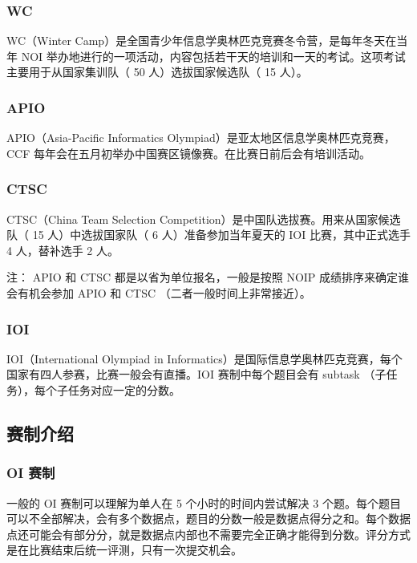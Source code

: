 \subsubsection{WC}

WC（Winter Camp）是全国青少年信息学奥林匹克竞赛冬令营，是每年冬天在当年 NOI 举办地进行的一项活动，内容包括若干天的培训和一天的考试。这项考试主要用于从国家集训队（ 50 人）选拔国家候选队（ 15 人）。

\subsubsection{APIO}

APIO（Asia-Pacific Informatics Olympiad）是亚太地区信息学奥林匹克竞赛，CCF 每年会在五月初举办中国赛区镜像赛。在比赛日前后会有培训活动。

\subsubsection{CTSC}

CTSC（China Team Selection Competition）是中国队选拔赛。用来从国家候选队（ 15 人）中选拔国家队（ 6 人）准备参加当年夏天的 IOI 比赛，其中正式选手 4 人，替补选手 2 人。

注： APIO 和 CTSC 都是以省为单位报名，一般是按照 NOIP 成绩排序来确定谁会有机会参加 APIO 和 CTSC （二者一般时间上非常接近）。

\subsubsection{IOI}

IOI（International Olympiad in Informatics）是国际信息学奥林匹克竞赛，每个国家有四人参赛，比赛一般会有直播。IOI 赛制中每个题目会有 subtask （子任务），每个子任务对应一定的分数。

\subsection{赛制介绍}

\subsubsection{OI 赛制}

一般的 OI 赛制可以理解为单人在 5 个小时的时间内尝试解决 3 个题。每个题目可以不全部解决，会有多个数据点，题目的分数一般是数据点得分之和。每个数据点还可能会有部分分，就是数据点内部也不需要完全正确才能得到分数。评分方式是在比赛结束后统一评测，只有一次提交机会。

